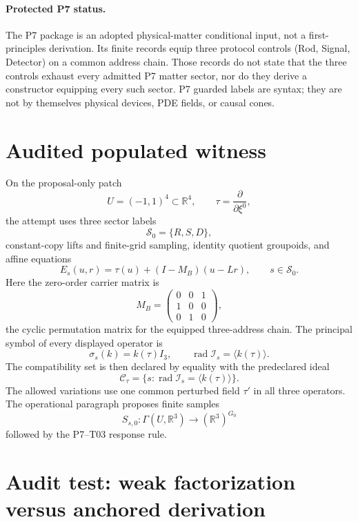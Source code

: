 \documentclass[11pt]{article}
\newcommand{\R}{\mathbb{R}}
\newcommand{\cI}{\mathcal{I}}
\newcommand{\cC}{\mathcal{C}}
\newcommand{\cS}{\mathcal{S}}
\newcommand{\rad}{\operatorname{rad}}
\begin{document}
\paragraph{Protected P7 status.}
The P7 package is an adopted physical-matter conditional input, not a
first-principles derivation.  Its finite records equip three protocol controls
(Rod, Signal, Detector) on a common address chain.  Those records do not state
that the three controls exhaust every admitted P7 matter sector, nor do they
derive a constructor equipping every such sector.  P7 guarded labels are
syntax; they are not by themselves physical devices, PDE fields, or causal
cones.

\section{Audited populated witness}

On the proposal-only patch
\[
 U=(-1,1)^4\subset \R^4,
 \qquad \tau=\frac{\partial}{\partial \xi^0},
\]
the attempt uses three sector labels
\[
 \cS_0=\{R,S,D\},
\]
constant-copy lifts and finite-grid sampling, identity quotient groupoids, and
affine equations
\begin{equation}
 E_s(u,r)=\tau(u)+(I-M_B)(u-Lr),\qquad s\in\cS_0.
 \label{eq:operator}
\end{equation}
Here the zero-order carrier matrix is
\[
 M_B=
 \begin{pmatrix}
 0&0&1\\
 1&0&0\\
 0&1&0
 \end{pmatrix},
\]
the cyclic permutation matrix for the equipped three-address chain.  The
principal symbol of every displayed operator is
\begin{equation}
 \sigma_s(k)=k(\tau)I_3,\qquad
 \rad\cI_s=\langle k(\tau)\rangle.
 \label{eq:ideal}
\end{equation}
The compatibility set is then declared by equality with the predeclared ideal
\[
 \cC_\tau=\{s:\rad\cI_s=\langle k(\tau)\rangle\}.
\]
The allowed variations use one common perturbed field \(\tau'\) in all three
operators.  The operational paragraph proposes finite samples
\[
 S_{s,0}:\Gamma(U,\R^3)\longrightarrow(\R^3)^{G_0}
\]
followed by the P7--T03 response rule.

\section{Audit test: weak factorization versus anchored derivation}
\end{document}
